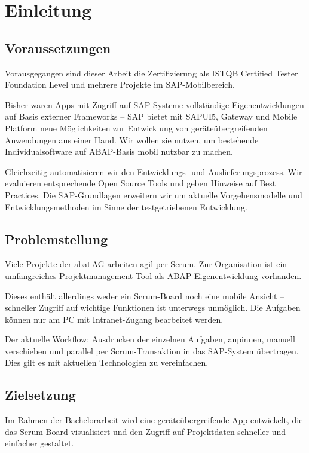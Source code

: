 \chapter{Einleitung}
\label{cha:Einleitung}


\section{Voraussetzungen}
Vorausgegangen sind dieser Arbeit \ua die Zertifizierung als ISTQB Certified Tester Foundation Level und mehrere Projekte im SAP-Mobilbereich.

Bisher waren Apps mit Zugriff auf SAP-Systeme vollständige Eigenentwicklungen auf Basis externer Frameworks -- SAP bietet mit SAPUI5, Gateway und Mobile Platform neue Möglichkeiten zur Entwicklung von geräteübergreifenden Anwendungen aus einer Hand. Wir wollen sie nutzen, um bestehende Individualsoftware auf ABAP-Basis mobil nutzbar zu machen.

Gleichzeitig automatisieren wir den Entwicklungs- und
Auslieferungsprozess. Wir evaluieren entsprechende Open Source Tools und geben Hinweise auf  Best Practices. Die SAP-Grundlagen erweitern wir um aktuelle Vorgehensmodelle und Entwicklungsmethoden im Sinne der testgetriebenen Entwicklung.


\section{Problemstellung}
Viele Projekte der abat\,AG arbeiten agil \zB per Scrum. Zur Organisation ist ein umfangreiches Projektmanagement-Tool als ABAP-Eigenentwicklung vorhanden.

Dieses enthält allerdings weder ein Scrum-Board noch eine mobile Ansicht --
schneller Zugriff auf wichtige Funktionen ist unterwegs unmöglich. Die Aufgaben
können nur am PC mit Intranet-Zugang bearbeitet werden.

Der aktuelle Workflow: Ausdrucken der einzelnen Aufgaben, anpinnen, manuell
verschieben und parallel per Scrum-Transaktion in das SAP-System übertragen.
Dies gilt es mit aktuellen Technologien zu vereinfachen.


\section{Zielsetzung}
Im Rahmen der Bachelorarbeit wird eine geräteübergreifende App entwickelt, die
das Scrum-Board visualisiert und den Zugriff auf Projektdaten schneller und
einfacher gestaltet.

